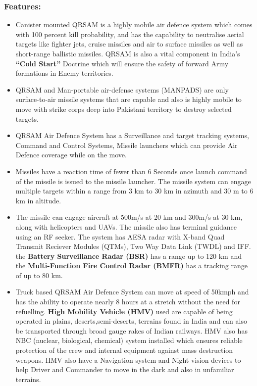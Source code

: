 \documentclass[14pt]{article} %
\begin{document}
\subsubsection{Features:}
\begin{itemize}
\item[] Canister mounted QRSAM is a highly mobile air defence system which comes with 100 percent kill probability, and has the capability to neutralise aerial targets like fighter jets, cruise missiles and air ­to ­surface missiles as well as short-range ballistic missiles. QRSAM is also a vital component in India’s \textbf{“Cold Start”} Doctrine which will ensure the safety of forward Army formations in Enemy territories.
\item[] QRSAM and Man-portable air-defense systems (MANPADS) are only surface-to-air missile systems that are capable and also is highly mobile to move with strike corps deep into Pakistani territory to destroy selected targets.
\item[] QRSAM Air Defence System has a Surveillance and target tracking systems, Command and Control Systems, Missile launchers which can provide Air Defence coverage while on the move. 
\item[] Missiles have a reaction time of fewer than 6 Seconds once launch command of the missile is issued to the missile launcher. The missile system can engage multiple targets within a range from 3 km to 30 km in azimuth and 30 m to 6 km in altitude.
\item[] The missile can engage aircraft at 500m/s at 20 km and 300m/s at 30 km, along with helicopters and UAVs. The missile also has terminal guidance using an RF seeker. The system has AESA radar with X-band Quad Transmit Reciever Modules (QTMs), Two Way Data Link (TWDL) and IFF. the \textbf{Battery Surveillance Radar (BSR)} has a range up to 120 km and the\textbf{ Multi-Function Fire Control Radar (BMFR)} has a tracking range of up to 80 km. 
\item[] Truck based QRSAM Air Defence System can move at speed of 50kmph and has the ability to operate nearly 8 hours at a stretch without the need for refuelling. \textbf{High Mobility Vehicle (HMV)} used are capable of being operated in plains, deserts,semi-deserts, terrains found in India and can also be transported through broad gauge rakes of Indian railways. HMV also has NBC (nuclear, biological, chemical) system installed which ensures reliable protection of the crew and internal equipment against mass destruction weapons. HMV also have a Navigation system and Night vision devices to help Driver and Commander to move in the dark and also in unfamiliar terrains.

\end{itemize}
\end{document}
